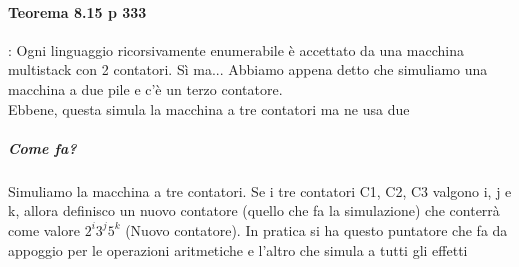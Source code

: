 \documentclass[12pt, a4paper, openany, oneside]{book}
\begin{document}
\paragraph{Teorema 8.15 p 333}: Ogni linguaggio ricorsivamente enumerabile è 
accettato da una macchina multistack con 2 contatori. Sì ma... Abbiamo appena
detto che simuliamo una macchina a due pile e c'è un terzo contatore.\\
Ebbene, questa simula la macchina a tre contatori ma ne usa due
\subparagraph{Come fa?} Simuliamo la macchina a tre contatori. Se i tre contatori
C1, C2, C3 valgono i, j e k, allora definisco un nuovo contatore (quello che
fa la simulazione) che conterrà come valore $2^{i} 3^{j} 5^{k}$ (Nuovo contatore).
In pratica si ha questo puntatore che fa da appoggio per le operazioni aritmetiche
e l'altro che simula a tutti gli effetti
\end{document}
